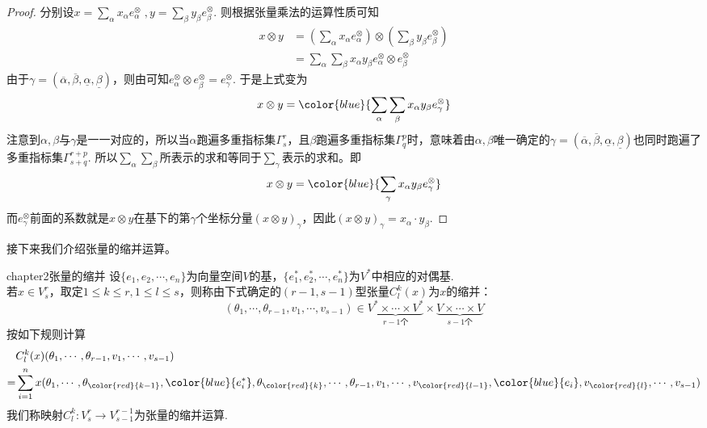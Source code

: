 \begin{proof}
	分别设$x=\sum_{ \alpha }x_{\alpha}e^{\otimes}_{\alpha}\;,y=\sum_{\beta}y_{\beta}e^{\otimes}_{\beta}$. 则根据张量乘法的运算性质可知
	\[
	\begin{split}
	x\otimes y&=\left(\sum_{ \alpha }x_{\alpha}e^{\otimes}_{\alpha} \right)\otimes \left( \sum_{\beta}y_{\beta}e^{\otimes}_{\beta}\right)\\
	&=\sum_{ \alpha }\sum_{\beta}x_{\alpha}y_{\beta}e^{\otimes}_{\alpha}\otimes e^{\otimes}_{\beta}
	\end{split}
	\]
	由于$\gamma=(\overline{\alpha},\overline{\beta},\underline{\alpha},\underline{\beta})$，则由可知$e^{\otimes}_{\alpha}\otimes e^{\otimes}_{\beta}=e^{\otimes}_{\gamma}$. 于是上式变为
	\[
	x\otimes y
	={\color{blue}{\sum_{ \alpha }\sum_{\beta}x_{\alpha}y_{\beta}e^{\otimes}_{\gamma}}}
	\]
	注意到$\alpha,\beta$与$\gamma$是一一对应的，所以当$\alpha$跑遍多重指标集$\Gamma^{r}_{s}$，且$\beta$跑遍多重指标集$\Gamma^{p}_{q}$时，意味着由$\alpha,\beta$唯一确定的$\gamma=(\overline{\alpha},\overline{\beta},\underline{\alpha},\underline{\beta})$也同时跑遍了多重指标集$ \Gamma^{r+p}_{s+q}$. 所以$\sum_{ \alpha }\sum_{\beta}$所表示的求和等同于$\sum_{ \gamma }$表示的求和。即
	\[
	x\otimes y
	={\color{blue}{\sum_{ \gamma }x_{\alpha}y_{\beta}e^{\otimes}_{\gamma}}}
	\]
	而$e^{\otimes}_{\gamma}$前面的系数就是$x\otimes y$在基下的第$\gamma$个坐标分量$(x\otimes y)_{\gamma}$，因此$(x\otimes y)_{\gamma}=x_{\alpha}\cdot y_{\beta}$.
\end{proof}

接下来我们介绍张量的缩并运算。

\begin{mydef}{}{chapter2张量的缩并}
	设$\{e_{1},e_{2},\cdots,e_{n} \}$为向量空间$V$的基，$\{e^{\ast}_{1},e^{\ast}_{2},\cdots,e^{\ast}_{n} \}$为$V^{\ast}$中相应的对偶基. \\
	若$x\in V^{r}_{s}$，取定$1\leqslant k\leqslant r,1\leqslant l\leqslant s$，则称由下式确定的$(r-1,s-1)$型张量$C^{k}_{l}(x)$为$x$的缩并：
	\[
		(\theta_{1},\cdots,\theta_{r-1},v_{1},\cdots,v_{s-1})\in\underbrace{ V^{\ast}\times \cdots\times V^{\ast}}_{r-1\text{个}}\times \underbrace{V\times\cdots\times V}_{s-1\text{个}}
	\]
	按如下规则计算
	\[
	\begin{split}
	&C^{k}_{l}(x)(\theta_{1},\cdots,\theta_{r-1},v_{1},\cdots,v_{s-1})\\
	=& \sum_{i=1}^{n}x(\theta_{1},\cdots,\theta_{\color{red}{k-1}},{\color{blue}{e^{\ast}_{i}}},\theta_{\color{red}{k}},\cdots,\theta_{r-1},v_{1},\cdots,v_{\color{red}{l-1}},{\color{blue}{e_{i}}},v_{\color{red}{l}},\cdots,v_{s-1})
	\end{split}
	\]
	我们称映射$C^{k}_{l}:V^{r}_{s}\longrightarrow V^{r-1}_{s-1}$为张量的缩并运算.
\end{mydef}

